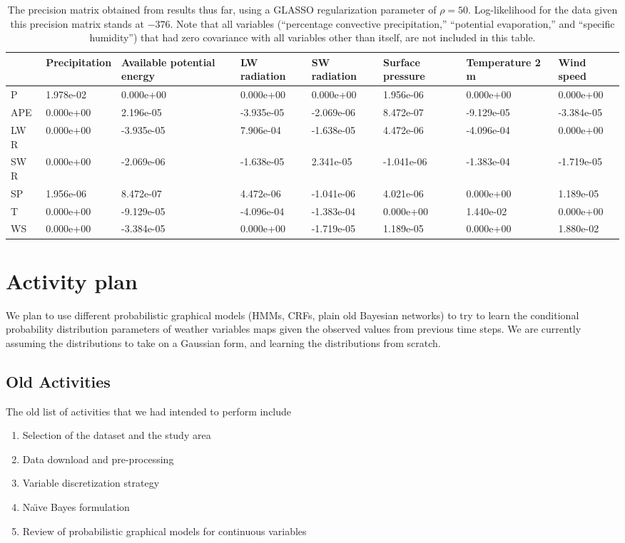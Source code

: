 \documentclass{article}
\begin{document}
\begin{table}[t]
\caption{The precision matrix obtained from results thus far, using a GLASSO regularization parameter of $\rho = 50$. Log-likelihood for the data given this precision matrix stands at $-376$. Note that all variables (``percentage convective precipitation,'' ``potential evaporation,'' and ``specific humidity'') that had zero covariance with all variables other than itself, are not included in this table.}
\label{tab:precision}
\begin{tabular}{ p{1cm} p{2cm} p{2cm} p{2cm} p{2cm} p{2cm} p{2cm} p{2cm}}
\hline
& Precipitation & Available potential energy & LW radiation & SW radiation & Surface pressure & Temperature 2 m & Wind speed\\
\hline
P   & 1.978e-02 & 0.000e+00 & 0.000e+00 & 0.000e+00 & 1.956e-06 & 0.000e+00 & 0.000e+00\\
APE &0.000e+00 & 2.196e-05 &-3.935e-05 &-2.069e-06 & 8.472e-07 &-9.129e-05 &-3.384e-05\\
LW R&0.000e+00 &-3.935e-05 & 7.906e-04 &-1.638e-05 & 4.472e-06 &-4.096e-04 & 0.000e+00\\
SW R&0.000e+00 &-2.069e-06 &-1.638e-05 & 2.341e-05 &-1.041e-06 &-1.383e-04 &-1.719e-05\\
SP  &1.956e-06 & 8.472e-07 & 4.472e-06 &-1.041e-06 & 4.021e-06 & 0.000e+00 & 1.189e-05\\
T   &0.000e+00 &-9.129e-05 &-4.096e-04 &-1.383e-04 & 0.000e+00 & 1.440e-02 & 0.000e+00\\
WS  &0.000e+00 &-3.384e-05 & 0.000e+00 &-1.719e-05 & 1.189e-05 & 0.000e+00 & 1.880e-02\\
\hline
\end{tabular}
\end{table}

\section{Activity plan}

We plan to use different probabilistic graphical models (HMMs, CRFs, plain old
Bayesian networks) to try to learn the conditional probability distribution
parameters of weather variables maps given the observed values from previous
time steps. We are currently assuming the distributions to take on a Gaussian
form, and learning the distributions from scratch.

\subsection{Old Activities}
The old list of activities that we had intended to perform include
\begin{enumerate}
\item Selection of the dataset and the study area
\item Data download and pre-processing
\item Variable discretization strategy
\item Na\"\i ve Bayes formulation
\item Review of probabilistic graphical models for continuous variables
\end{enumerate}
\end{document}
